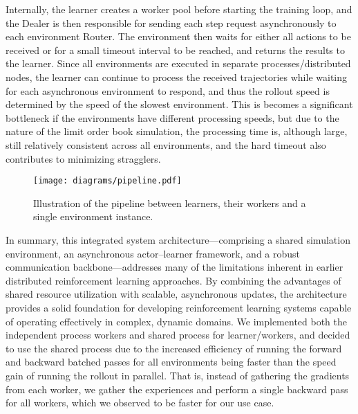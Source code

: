 \documentclass[11pt]{article}
\begin{document}
    Internally, the learner creates a worker pool before starting the training loop, and the Dealer is then responsible
    for sending each step request asynchronously to each environment Router.
    The environment then waits for either all actions to be received or for a small timeout interval to be reached,
    and returns the results to the learner.
    Since all environments are executed in separate processes/distributed nodes, the learner can continue to process the
    received trajectories while waiting for each asynchronous environment to respond,
    and thus the rollout speed is determined by the speed of the slowest environment.
    This is becomes a significant bottleneck if the environments have different processing speeds,
    but due to the nature of the limit order book simulation, the processing time is, although large,
    still relatively consistent across all environments, and the hard timeout also contributes to minimizing stragglers.

    \begin{figure}
        \centering
        \texttt{[image: diagrams/pipeline.pdf]}
        \caption{Illustration of the pipeline between learners, their workers and a single environment instance.}
        \label{fig:lob_simulation}
    \end{figure}

    In summary, this integrated system architecture—comprising a shared simulation environment, an asynchronous actor–learner framework, and
    a robust communication backbone—addresses many of the limitations inherent in earlier distributed reinforcement learning approaches.
    By combining the advantages of shared resource utilization with scalable, asynchronous updates, the architecture provides a solid foundation for
    developing reinforcement learning systems capable of operating effectively in complex, dynamic domains.
    We implemented both the independent process workers and shared process for learner/workers,
    and decided to use the shared process due to the increased efficiency of running the forward and backward batched passes
    for all environments being faster than the speed gain of running the rollout in parallel.
    That is, instead of gathering the gradients from each worker, we gather the experiences and perform
    a single backward pass for all workers, which we observed to be faster for our use case.
\end{document}
